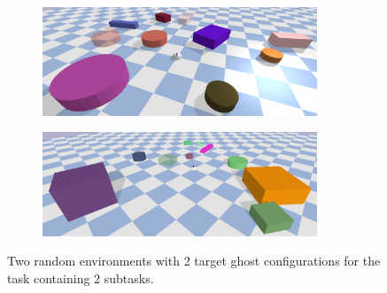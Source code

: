 \begin{figure}[H]
    \centering
    \begin{subfigure}{\textwidth}
    \centering
    \includegraphics[width=0.9\textwidth]{figures/tests/random_1}
    \end{subfigure}

    \vspace{0.2cm}
    \begin{subfigure}{\textwidth}
    \centering
    \includegraphics[width=0.9\textwidth]{figures/tests/random_2}
    \end{subfigure}
    \caption{Two random environments with 2 target ghost configurations for the task containing 2 subtasks.}%
    \label{fig:random_environnment}
\end{figure}

